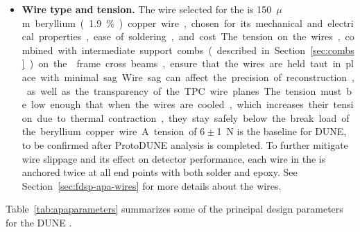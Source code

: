 \begin{itemize}
\item \textbf{Wire type and tension.}  The wire selected for the  is \SI{150}{$\mu$m} beryllium (\num{1.9}\%) copper wire, %
chosen for its mechanical and electrical properties, ease of soldering, and cost.  The tension on the wires, combined with intermediate support combs (described in Section~\ref{sec:combs}) on the  frame cross beams, ensure that the wires are held taut in place with minimal sag.  Wire sag can affect the precision of reconstruction, as well as the transparency of the TPC wire planes.  The tension must be low enough that when the wires are cooled, which increases their tension due to thermal contraction, they stay safely below the break load of the beryllium copper wire.  A tension of $6\pm$\SI{1}{N} is the baseline for DUNE, to be confirmed after ProtoDUNE analysis is completed.  To further mitigate wire slippage and its effect on detector performance, each wire in the  is anchored twice at all end points with both solder and epoxy.  See Section~\ref{sec:fdsp-apa-wires} for more details about the wires.

\end{itemize}

Table~\ref{tab:apaparameters} summarizes some of the principal design parameters for the DUNE 
.

